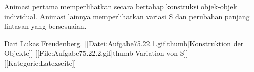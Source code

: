 Animasi pertama memperlihatkan secara bertahap konstruksi objek-objek individual. Animasi lainnya memperlihatkan variasi S dan perubahan panjang lintasan yang bersesuaian.

Dari Lukas Freudenberg.
[[Datei:Aufgabe75.22.1.gif|thumb|Konstruktion der Objekte]]
[[File:Aufgabe75.22.2.gif|thumb|Variation von S]] [[Kategorie:Latexseite]]
